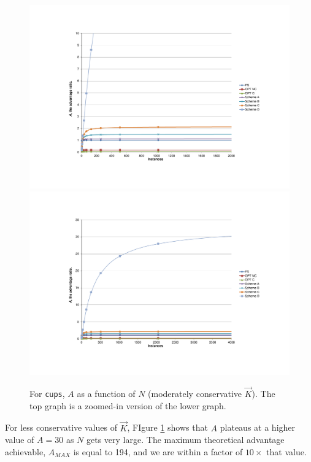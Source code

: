 \begin{figure}
  \centering
  \subfloat%
           {\includegraphics[scale=0.75, trim=5cm 3cm 0cm 4.5cm]{cups-2.pdf} \label{cups2}} \\
  \subfloat%
           {\includegraphics[scale=0.75, trim=5cm 3cm 0cm 3cm]{cups-3.pdf} \label{cups3}} 
  \caption[For \texttt{cups}, $A$ as a function of $N$ (moderately conservative $\vec K$)]%
          {For \texttt{cups}, $A$ as a function of $N$ (moderately conservative $\vec K$).
          The top graph is a zoomed-in version of the lower graph.}
  \label{cups23}
\end{figure}

For less conservative values of $\vec K$, FIgure \ref{cups23} shows that $A$
plateaus at a higher value of $A = 30$ as $N$ gets very large. The maximum
theoretical advantage achievable, $A_{MAX}$ is equal to 194, and we 
are within a factor of $10\times$ that value.

